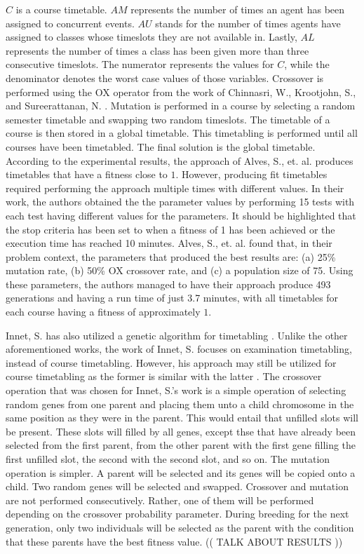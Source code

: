 $C$ is a course timetable. $AM$ represents the number of times an agent has been assigned to concurrent events. $AU$ stands for the number of times agents have assigned to classes whose timeslots they are not available in. Lastly, $AL$ represents the number of times a class has been given more than three consecutive timeslots. The numerator represents the values for $C$, while the denominator denotes the worst case values of those variables. Crossover is performed using the OX operator from the work of Chinnasri, W., Krootjohn, S., and Sureerattanan, N. \cite{wutthipong-performance-study-genetic-operators}. Mutation is performed in a course by selecting a random semester timetable and swapping two random timeslots. The timetable of a course is then stored in a global timetable. This timetabling is performed until all courses have been timetabled. The final solution is the global timetable. According to the experimental results, the approach of Alves, S., et. al. produces timetables that have a fitness close to $1$. However, producing fit timetables required performing the approach multiple times with different values. In their work, the authors obtained the the parameter values by performing 15 tests with each test having different values for the parameters. It should be highlighted that the stop criteria has been set to when a fitness of 1 has been achieved or the execution time has reached 10 minutes. Alves, S., et. al. found that, in their problem context, the parameters that produced the best results are: (a) 25\% mutation rate, (b) 50\% OX crossover rate, and (c) a population size of 75. Using these parameters, the authors managed to have their approach produce 493 generations and having a run time of just 3.7 minutes, with all timetables for each course having a fitness of approximately $1$.

Innet, S. has also utilized a genetic algorithm for timetabling \cite{supachate-noval-approach-ga-thai}. Unlike the other aforementioned works, the work of Innet, S. focuses on examination timetabling, instead of course timetabling. However, his approach may still be utilized for course timetabling as the former is similar with the latter
. The crossover operation that was chosen for Innet, S.'s work is a simple operation of selecting random genes from one parent and placing them unto a child chromosome in the same position as they were in the parent. This would entail that unfilled slots will be present. These slots will filled by all genes, except thse that have already been selected from the first parent, from the other parent with the first gene filling the first unfilled slot, the second with the second slot, and so on. The mutation operation is simpler. A parent will be selected and its genes will be copied onto a child. Two random genes will be selected and swapped. Crossover and mutation are not performed consecutively. Rather, one of them will be performed depending on the crossover probability parameter. During breeding for the next generation, only two individuals will be selected as the parent with the condition that these parents have the best fitness value.  (( TALK ABOUT RESULTS ))

%
%
%
%
%
%
%
%
%